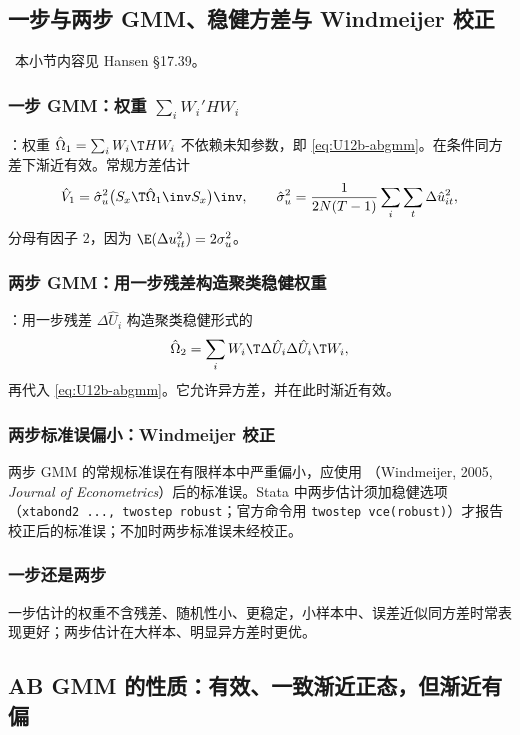 \subsection{一步与两步 GMM、稳健方差与 Windmeijer 校正}

\tagext\ 本小节内容见 Hansen §17.39。

\subsubsection{一步 GMM：权重 \texorpdfstring{$\sum_iW_i'HW_i$}{sum W'HW}}

：权重 $\hat\Omega_1=\sum_iW_i\T HW_i$ 不依赖未知参数，即 \eqref{eq:U12b-abgmm}。在条件同方差下渐近有效。常规方差估计
\[
\hat V_1=\hat\sigma_u^2\big(S_x\T\hat\Omega_1\inv S_x\big)\inv,\qquad \hat\sigma_u^2=\frac{1}{2N(T-1)}\sum_i\sum_t\Delta\hat u_{it}^2,
\]
分母有因子 $2$，因为 $\E(\Delta u_{it}^2)=2\sigma_u^2$。

\subsubsection{两步 GMM：用一步残差构造聚类稳健权重}

：用一步残差 $\Delta\hat U_i$ 构造聚类稳健形式的
\[
\hat\Omega_2=\sum_iW_i\T\Delta\hat U_i\Delta\hat U_i\T W_i,
\]
再代入 \eqref{eq:U12b-abgmm}。它允许异方差，并在此时渐近有效。

\subsubsection{两步标准误偏小：Windmeijer 校正}

两步 GMM 的常规标准误在有限样本中严重偏小，应使用 （Windmeijer, 2005, \emph{Journal of Econometrics}）后的标准误。Stata 中两步估计须加稳健选项（\texttt{xtabond2 ..., twostep robust}；官方命令用 \texttt{twostep vce(robust)}）才报告校正后的标准误；不加时两步标准误未经校正。

\subsubsection{一步还是两步}

一步估计的权重不含残差、随机性小、更稳定，小样本中、误差近似同方差时常表现更好；两步估计在大样本、明显异方差时更优。

\subsection{AB GMM 的性质：有效、一致渐近正态，但渐近有偏}

